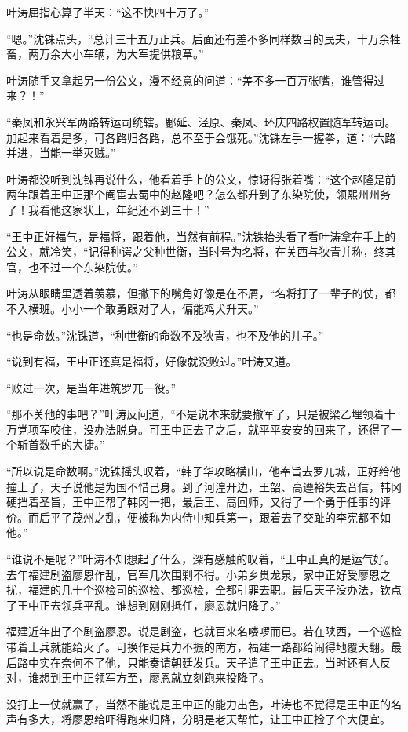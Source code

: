 叶涛屈指心算了半天：“这不快四十万了。”

“嗯。”沈铢点头，“总计三十五万正兵。后面还有差不多同样数目的民夫，十万余牲畜，两万余大小车辆，为大军提供粮草。”

叶涛随手又拿起另一份公文，漫不经意的问道：“差不多一百万张嘴，谁管得过来？！”

“秦凤和永兴军两路转运司统辖。鄜延、泾原、秦凤、环庆四路权置随军转运司。加起来看着是多，可各路归各路，总不至于会饿死。”沈铢左手一握拳，道：“六路并进，当能一举灭贼。”

叶涛都没听到沈铢再说什么，他看着手上的公文，惊讶得张着嘴：“这个赵隆是前两年跟着王中正那个阉宦去蜀中的赵隆吧？怎么都升到了东染院使，领熙州州务了！我看他这家状上，年纪还不到三十！”

“王中正好福气，是福将，跟着他，当然有前程。”沈铢抬头看了看叶涛拿在手上的公文，就冷笑，“记得种谔之父种世衡，当时号为名将，在关西与狄青并称，终其官，也不过一个东染院使。”

叶涛从眼睛里透着羡慕，但撇下的嘴角好像是在不屑，“名将打了一辈子的仗，都不入横班。小小一个敢勇跟对了人，偏能鸡犬升天。”

“也是命数。”沈铢道，“种世衡的命数不及狄青，也不及他的儿子。”

“说到有福，王中正还真是福将，好像就没败过。”叶涛又道。

“败过一次，是当年进筑罗兀一役。”

“那不关他的事吧？”叶涛反问道，“不是说本来就要撤军了，只是被梁乙埋领着十万党项军咬住，没办法脱身。可王中正去了之后，就平平安安的回来了，还得了一个斩首数千的大捷。”

“所以说是命数啊。”沈铢摇头叹着，“韩子华攻略横山，他奉旨去罗兀城，正好给他撞上了，天子说他是为国不惜己身。到了河湟开边，王韶、高遵裕失去音信，韩冈硬挡着圣旨，王中正帮了韩冈一把，最后王、高回师，又得了一个勇于任事的评价。而后平了茂州之乱，便被称为内侍中知兵第一，跟着去了交趾的李宪都不如他。”

“谁说不是呢？”叶涛不知想起了什么，深有感触的叹着，“王中正真的是运气好。去年福建剧盗廖恩作乱，官军几次围剿不得。小弟乡贯龙泉，家中正好受廖恩之扰，福建的几十个巡检司的巡检、都巡检，全都引罪去职。最后天子没办法，钦点了王中正去领兵平乱。谁想到刚刚抵任，廖恩就归降了。”

福建近年出了个剧盗廖恩。说是剧盗，也就百来名喽啰而已。若在陕西，一个巡检带着土兵就能给灭了。可换作是兵力不振的南方，福建一路都给闹得地覆天翻。最后路中实在奈何不了他，只能奏请朝廷发兵。天子遣了王中正去。当时还有人反对，谁想到王中正领军方至，廖恩就立刻跑来投降了。

没打上一仗就赢了，当然不能说是王中正的能力出色，叶涛也不觉得是王中正的名声有多大，将廖恩给吓得跑来归降，分明是老天帮忙，让王中正捡了个大便宜。

